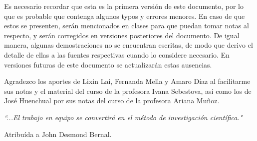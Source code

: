 \documentclass[letterpaper,12pt, twoside]{book}
\theoremstyle{definition}
\begin{document}
Es necesario recordar que esta es la primera versión de este documento, por lo que es probable que contenga algunos typos y errores menores. En caso de que estos se presenten, serán mencionados en clases para que puedan tomar notas al respecto, y serán corregidos en versiones posteriores del documento. De igual manera, algunas demostraciones no se encuentran escritas, de modo que derivo el detalle de ellas a las fuentes respectivas cuando lo considere necesario. En versiones futuras de este documento se actualizarán estas ausencias.


Agradezco los aportes de Lixin Lai, Fernanda Mella y Amaro Díaz al facilitarme sus notas y el material del curso de la profesora Ivana Sebestova, así como los de José Huenchual por sus notas del curso de la profesora Ariana Muñoz.

\vfill

\emph{\textquotedblleft ...El trabajo en equipo se convertirá en el método de investigación científica."}

\begin{flushright}
Atribuída a John Desmond Bernal.
\end{flushright}



\tableofcontents

\mainmatter

\pagestyle{fancy}











\appendix




\backmatter

\nocite{*} %
\setcounter{chapter}{0}

\printbibliography[heading=bibintoc, title=Referencias]
\end{document}
